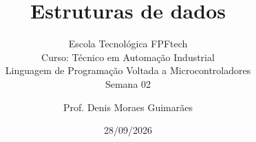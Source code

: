 \title{Estruturas de dados}
\subtitle{\texorpdfstring{Escola Tecnológica FPFtech\\[0.2cm]
Curso: Técnico em Automação Industrial\\[0.2cm]
\small Linguagem de Programação Voltada a Microcontroladores\\[0.15cm]
Semana 02}{FPFtech — Técnico em Automação Industrial — Semana 02}}
\author{Prof. Denis Moraes Guimarães}
\date{28/09/2026}
